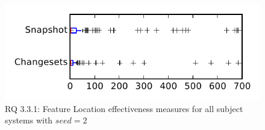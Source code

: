 
\begin{figure}
\centering
\includegraphics[height=0.4\textheight]{figures/flt_seed/rq1_tiny_2}
\caption{RQ 3.3.1: Feature Location effectiveness measures for all subject systems with $seed=2$}
\label{fig:flt_seed:rq1:tiny}
\end{figure}
